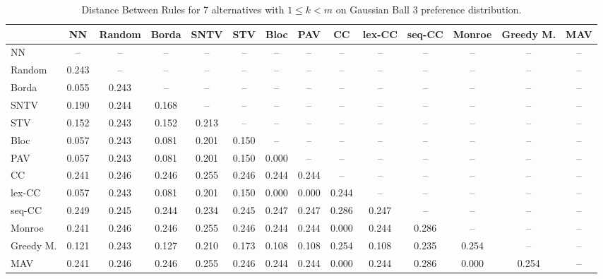
\begin{table*}
\centering
\begin{tabular}{lccccccccccccc}
\toprule
 & NN & Random & Borda & SNTV & STV & Bloc & PAV & CC & lex-CC & seq-CC & Monroe & Greedy M. & MAV \\
\midrule
NN & -- & -- & -- & -- & -- & -- & -- & -- & -- & -- & -- & -- & -- \\
Random & 0.243 & -- & -- & -- & -- & -- & -- & -- & -- & -- & -- & -- & -- \\
Borda & 0.055 & 0.243 & -- & -- & -- & -- & -- & -- & -- & -- & -- & -- & -- \\
SNTV & 0.190 & 0.244 & 0.168 & -- & -- & -- & -- & -- & -- & -- & -- & -- & -- \\
STV & 0.152 & 0.243 & 0.152 & 0.213 & -- & -- & -- & -- & -- & -- & -- & -- & -- \\
Bloc & 0.057 & 0.243 & 0.081 & 0.201 & 0.150 & -- & -- & -- & -- & -- & -- & -- & -- \\
PAV & 0.057 & 0.243 & 0.081 & 0.201 & 0.150 & 0.000 & -- & -- & -- & -- & -- & -- & -- \\
CC & 0.241 & 0.246 & 0.246 & 0.255 & 0.246 & 0.244 & 0.244 & -- & -- & -- & -- & -- & -- \\
lex-CC & 0.057 & 0.243 & 0.081 & 0.201 & 0.150 & 0.000 & 0.000 & 0.244 & -- & -- & -- & -- & -- \\
seq-CC & 0.249 & 0.245 & 0.244 & 0.234 & 0.245 & 0.247 & 0.247 & 0.286 & 0.247 & -- & -- & -- & -- \\
Monroe & 0.241 & 0.246 & 0.246 & 0.255 & 0.246 & 0.244 & 0.244 & 0.000 & 0.244 & 0.286 & -- & -- & -- \\
Greedy M. & 0.121 & 0.243 & 0.127 & 0.210 & 0.173 & 0.108 & 0.108 & 0.254 & 0.108 & 0.235 & 0.254 & -- & -- \\
MAV & 0.241 & 0.246 & 0.246 & 0.255 & 0.246 & 0.244 & 0.244 & 0.000 & 0.244 & 0.286 & 0.000 & 0.254 & -- \\
\bottomrule
\end{tabular}

\caption{Distance Between Rules for 7 alternatives with $1 \leq k < m$ on Gaussian Ball 3 preference distribution.}
\end{table*}
